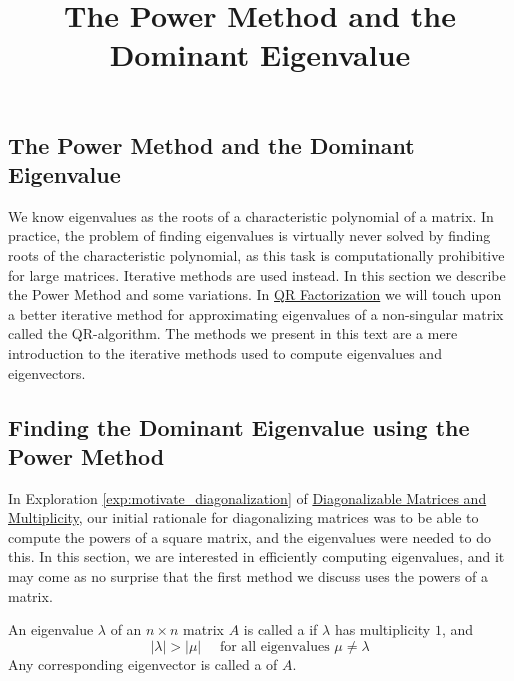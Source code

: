 \documentclass{ximera}
\title{The Power Method and the Dominant Eigenvalue} \license{CC BY-NC-SA 4.0}
\begin{document}
\begin{abstract}
\end{abstract}
\maketitle

\begin{onlineOnly}
\section*{The Power Method and the Dominant Eigenvalue}
\end{onlineOnly}

We know eigenvalues as the roots of a characteristic polynomial of a matrix.  In practice, the problem of finding eigenvalues is virtually never solved by finding roots of the characteristic polynomial, as this task is computationally prohibitive for large matrices.  Iterative methods are used instead.  In this section we describe the Power Method and some variations.  In \href{https://ximera.osu.edu/linearalgebradzv3/LinearAlgebraInteractiveIntro/RTH-0040/main}{QR Factorization} we will touch upon a better iterative method for approximating eigenvalues of a non-singular matrix called the QR-algorithm.  The methods we present in this text are a mere introduction to the iterative methods used to compute eigenvalues and eigenvectors.
  
\subsection*{Finding the Dominant Eigenvalue using the Power Method}

In Exploration \ref{exp:motivate_diagonalization} of \href{https://ximera.osu.edu/linearalgebradzv3/LinearAlgebraInteractiveIntro/EIG-0050/main}{Diagonalizable Matrices and Multiplicity},
 our initial rationale for diagonalizing matrices was to be able to
compute the powers of a square matrix, and the eigenvalues were needed
to do this. In this section, we are interested in efficiently computing
eigenvalues, and it may come as no surprise that the first method we
discuss uses the powers of a matrix.

\begin{definition}\label{def:dominant ew,ev}
An eigenvalue $\lambda$ of an $n \times n$ matrix $A$ is called a  if $\lambda$ has multiplicity $1$, and
\begin{equation*}
|\lambda| > |\mu| \quad \mbox{ for all eigenvalues } \mu \neq \lambda
\end{equation*}
Any corresponding eigenvector is called a  of $A$.
\end{definition}
\end{document}
